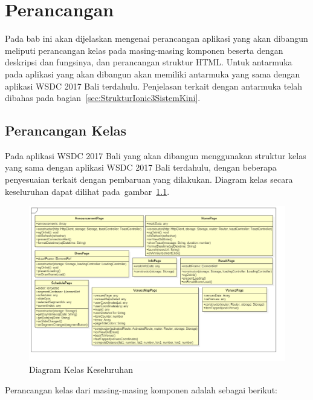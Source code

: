 \chapter{Perancangan}
\label{chap:perancangan}

Pada bab ini akan dijelaskan mengenai perancangan aplikasi yang akan dibangun meliputi perancangan kelas pada masing-masing komponen beserta dengan deskripsi dan fungsinya, dan perancangan struktur HTML. Untuk antarmuka pada aplikasi yang akan dibangun akan memiliki antarmuka yang sama dengan aplikasi WSDC 2017 Bali terdahulu. Penjelasan terkait dengan antarmuka telah dibahas pada bagian~\ref{sec:StrukturIonic3SistemKini}. 

\section{Perancangan Kelas}
\label{sec:perancanganKelas}

Pada aplikasi WSDC 2017 Bali yang akan dibangun menggunakan struktur kelas yang sama dengan aplikasi WSDC 2017 Bali terdahulu, dengan beberapa penyesuaian terkait dengan pembaruan yang dilakukan. Diagram kelas secara keseluruhan dapat dilihat pada~gambar~\ref{fig:umldiagramkeseluruhan}.

\begin{figure}[H]
    \centering
    \includegraphics[scale=0.43]{Gambar/umldiagram.png}
    \caption{ Diagram Kelas Keseluruhan}
    \label{fig:umldiagramkeseluruhan}
\end{figure}

\newpage

Perancangan kelas dari masing-masing komponen adalah sebagai berikut:

